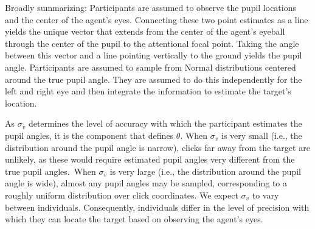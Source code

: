 \documentclass[
  man,mask,floatsintext]{apa6}
\begin{document}
Broadly summarizing: Participants are assumed to observe the pupil locations and the center of the agent's eyes. Connecting these two point estimates as a line yields the unique vector that extends from the center of the agent's eyeball through the center of the pupil to the attentional focal point. Taking the angle between this vector and a line pointing vertically to the ground yields the pupil angle. Participants are assumed to sample from Normal distributions centered around the true pupil angle. They are assumed to do this independently for the left and right eye and then integrate the information to estimate the target's location.

As \(\sigma_v\) determines the level of accuracy with which the participant estimates the pupil angles, it is the component that defines \(\theta\). When \(\sigma_v\) is very small (i.e., the distribution around the pupil angle is narrow), clicks far away from the target are unlikely, as these would require estimated pupil angles very different from the true pupil angles.~When \(\sigma_v\) is very large (i.e., the distribution around the pupil angle is wide), almost any pupil angles may be sampled, corresponding to a roughly uniform distribution over click coordinates. We expect \(\sigma_v\) to vary between individuals. Consequently, individuals differ in the level of precision with which they can locate the target based on observing the agent's eyes.
\end{document}
